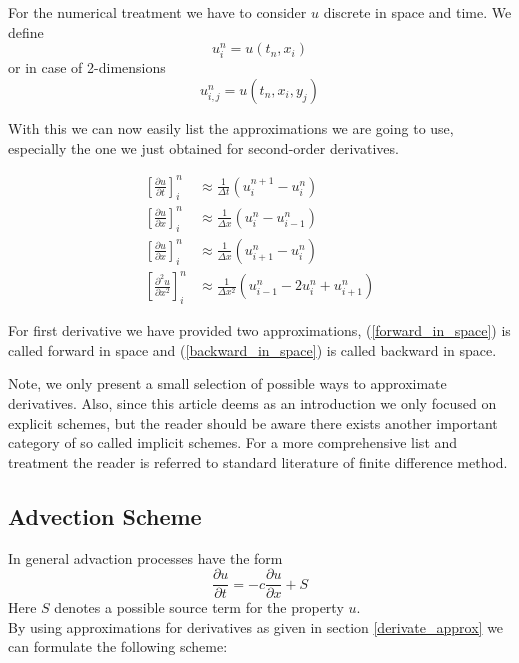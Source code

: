 \documentclass[]{article}
\begin{document}
For the numerical treatment we have to consider $u$ discrete in space and time.
We define 
\begin{equation*}
u_{i}^{n}=u(t_{n}, x_{i})
\end{equation*}
or in case of 2-dimensions
\begin{equation*}
u_{i,j}^{n}=u(t_{n}, x_{i}, y_{j})
\end{equation*}

With this we can now easily list the approximations we are going to use, especially the one
we just obtained for second-order derivatives.

\begin{eqnarray}
	\left[\frac{\partial u}{\partial t}\right]_{i}^{n} & \approx \frac{1}{\Delta t}(u_{i}^{n+1}-u_{i}^{n}) \nonumber  \\
	\left[\frac{\partial u}{\partial x}\right]_{i}^{n} & \approx \frac{1}{\Delta x}(u_{i}^{n}-u_{i-1}^{n})  \label{backward_in_space} \\
	\left[\frac{\partial u}{\partial x}\right]_{i}^{n} & \approx \frac{1}{\Delta x}(u_{i+1}^{n}-u_{i}^{n}) \label{forward_in_space}  \\
	\left[\frac{\partial^2 u}{\partial x^2}\right]_{i}^{n} & \approx
	\frac{1}{\Delta x^2}(u_{i-1}^{n}-2u_{i}^{n}+u_{i+1}^{n}) \nonumber
\end{eqnarray}

For first derivative we have provided two approximations, (\ref{forward_in_space}) is called
forward in space and (\ref{backward_in_space}) is called backward in space.

Note, we only present a small selection of possible ways to approximate derivatives. Also, since this article deems as an introduction we only focused on explicit schemes, but the reader should be aware there exists another important category of so called implicit schemes.
For a more comprehensive list and treatment the reader is referred to standard literature of finite difference method.

\subsection{Advection Scheme}

In general advaction processes have the form
\begin{equation*}
\frac{\partial u}{\partial t} = -c \frac{\partial u}{\partial x} + S
\end{equation*}
Here $S$ denotes a possible source term for the property $u$.\\
By using approximations for derivatives as given in section \ref{derivate_approx}
we can formulate the following scheme:
\end{document}
